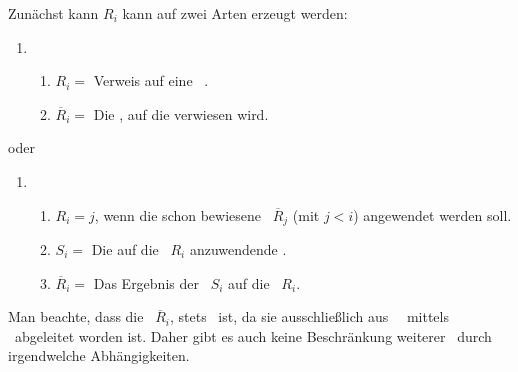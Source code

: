 {\begin{enumerate}
	Zunächst kann $R_i$ kann auf zwei Arten erzeugt werden:
	\begin{enumerate}
		\setcounter{enumii}{\value{Enumii}}%
		\item
		\begin{enumerate}
			\item $R_i =$ Verweis auf eine \allgemeingueltige\ \Schlussregel.
			\item $\overline{R}_i =$ Die \Schlussregel, auf die verwiesen wird.
		\end{enumerate}
		\setcounter{Enumii}{\value{enumii}}%
	\end{enumerate}
	oder
	\begin{enumerate}
		\item
		\begin{enumerate}
			\item $R_i = j$, wenn die schon bewiesene \Schlussregel\ $\overline{R}_j$ (mit $j < i$) angewendet werden soll.
			\item $S_i =$ Die auf die \Schlussregel\ $R_i$ anzuwendende \Substitution.
			\item $\overline{R}_i =$ Das Ergebnis der \Substitution\ $S_i$ auf die \Schlussregel\ $R_i$.
		\end{enumerate}
		\setcounter{Enumii}{\value{enumii}}%
	\end{enumerate}
	Man beachte, dass die \Schlussregel\ $\overline{R}_i$, stets \allgemeingueltig\ ist, da sie ausschließlich aus \allgemeingueltigen\ \Schlussregeln\ mittels \Substitutionen\ abgeleitet worden ist.
	Daher gibt es auch keine Beschränkung weiterer \Substitutionen\ durch irgendwelche Abhängigkeiten.


\end{enumerate}}
